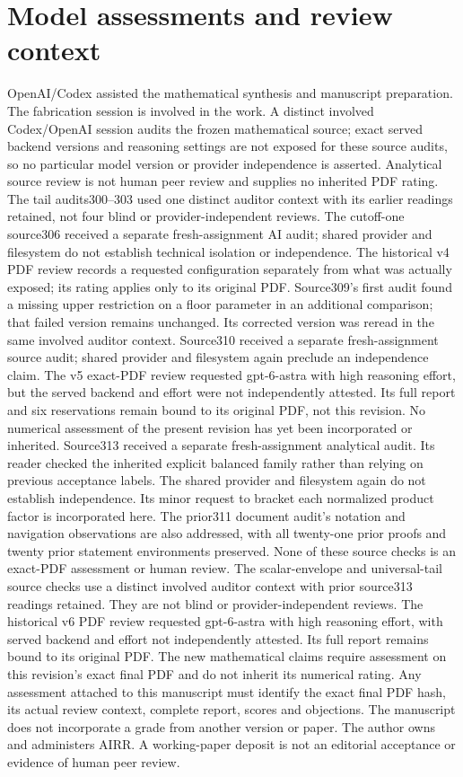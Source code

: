 \documentclass[11pt]{article}
\begin{document}
\section*{Model assessments and review context}
OpenAI/Codex assisted the mathematical synthesis and manuscript preparation.
The fabrication session is involved in the work. A distinct involved
Codex/OpenAI session audits the frozen mathematical source; exact served
backend versions and reasoning settings are not exposed for these source
audits, so no particular
model version or provider independence is asserted. Analytical source
review is not human peer review and supplies no inherited PDF rating.
The tail audits300--303 used one distinct auditor context with its earlier
readings retained, not four blind or provider-independent reviews. The
cutoff-one source306 received a separate fresh-assignment AI audit;
shared provider and filesystem do not establish technical isolation or
independence. The
historical v4 PDF review records a requested configuration separately from
what was actually exposed; its rating applies only to its original PDF.
Source309's first audit found a missing upper restriction on a floor
parameter in an additional comparison; that failed version remains
unchanged. Its corrected version was reread in the same involved auditor
context. Source310 received a separate fresh-assignment source audit;
shared provider and filesystem again preclude an independence claim.
The v5 exact-PDF review requested gpt-6-astra with high reasoning effort,
but the served backend and effort were not independently attested.
Its full report and six reservations remain bound to its original PDF,
not this revision. No numerical assessment of the present revision
has yet been incorporated or inherited.
Source313 received a separate fresh-assignment analytical audit. Its
reader checked the inherited explicit balanced family rather than relying
on previous acceptance labels. The shared provider and filesystem again
do not establish independence. Its minor request to bracket each
normalized product factor is incorporated here. The prior311 document
audit's notation and navigation observations are also addressed, with all
twenty-one prior proofs and twenty prior statement environments preserved.
None of these source checks is an exact-PDF assessment or human review.
The scalar-envelope and universal-tail source checks use a distinct
involved auditor context with prior source313 readings retained. They are
not blind or provider-independent reviews. The historical v6 PDF review
requested gpt-6-astra with high reasoning effort, with served backend and
effort not independently attested. Its full report remains bound to its
original PDF. The new mathematical claims require assessment on this
revision's exact final PDF and do not inherit its numerical rating.
Any assessment attached to this manuscript must identify the exact final
PDF hash, its actual review context, complete report, scores and objections.
The manuscript does not incorporate a grade from another version or paper.
The author owns and administers AIRR. A working-paper deposit is not an
editorial acceptance or evidence of human peer review.
\end{document}
